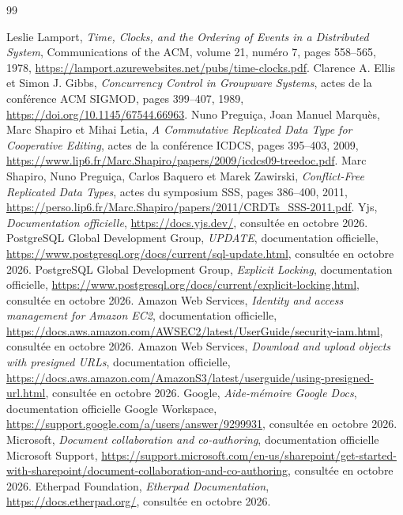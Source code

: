 \documentclass[12pt,a4paper,oneside]{report}
\begin{document}
\hypersetup{pageanchor=false}

\hypersetup{pageanchor=true}

\tableofcontents
\clearpage
{}
\listoffigures
\clearpage
{}
\listoftables
\clearpage
{}








\begin{thebibliography}{99}
 Leslie Lamport, \textit{Time, Clocks, and the Ordering of Events in a Distributed System}, Communications of the ACM, volume 21, numéro 7, pages 558--565, 1978, \url{https://lamport.azurewebsites.net/pubs/time-clocks.pdf}.
 Clarence A. Ellis et Simon J. Gibbs, \textit{Concurrency Control in Groupware Systems}, actes de la conférence ACM SIGMOD, pages 399--407, 1989, \url{https://doi.org/10.1145/67544.66963}.
 Nuno Preguiça, Joan Manuel Marquès, Marc Shapiro et Mihai Letia, \textit{A Commutative Replicated Data Type for Cooperative Editing}, actes de la conférence ICDCS, pages 395--403, 2009, \url{https://www.lip6.fr/Marc.Shapiro/papers/2009/icdcs09-treedoc.pdf}.
 Marc Shapiro, Nuno Preguiça, Carlos Baquero et Marek Zawirski, \textit{Conflict-Free Replicated Data Types}, actes du symposium SSS, pages 386--400, 2011, \url{https://perso.lip6.fr/Marc.Shapiro/papers/2011/CRDTs_SSS-2011.pdf}.
 Yjs, \textit{Documentation officielle}, \url{https://docs.yjs.dev/}, consultée en octobre 2026.
 PostgreSQL Global Development Group, \textit{UPDATE}, documentation officielle, \url{https://www.postgresql.org/docs/current/sql-update.html}, consultée en octobre 2026.
 PostgreSQL Global Development Group, \textit{Explicit Locking}, documentation officielle, \url{https://www.postgresql.org/docs/current/explicit-locking.html}, consultée en octobre 2026.
 Amazon Web Services, \textit{Identity and access management for Amazon EC2}, documentation officielle, \url{https://docs.aws.amazon.com/AWSEC2/latest/UserGuide/security-iam.html}, consultée en octobre 2026.
 Amazon Web Services, \textit{Download and upload objects with presigned URLs}, documentation officielle, \url{https://docs.aws.amazon.com/AmazonS3/latest/userguide/using-presigned-url.html}, consultée en octobre 2026.
 Google, \textit{Aide-mémoire Google Docs}, documentation officielle Google Workspace, \url{https://support.google.com/a/users/answer/9299931}, consultée en octobre 2026.
 Microsoft, \textit{Document collaboration and co-authoring}, documentation officielle Microsoft Support, \url{https://support.microsoft.com/en-us/sharepoint/get-started-with-sharepoint/document-collaboration-and-co-authoring}, consultée en octobre 2026.
 Etherpad Foundation, \textit{Etherpad Documentation}, \url{https://docs.etherpad.org/}, consultée en octobre 2026.
\end{thebibliography}
\end{document}
